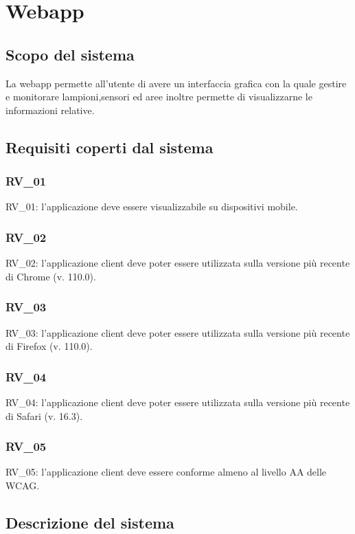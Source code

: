 \chapter{Webapp}\label{cap:webapp}

\section{Scopo del sistema}

La webapp permette all'utente di avere un interfaccia grafica con la quale gestire e monitorare lampioni,sensori ed aree inoltre permette di visualizzarne le informazioni relative.

\section{Requisiti coperti dal sistema}

\subsection{RV\_01}
RV\_01: l'applicazione deve essere visualizzabile su dispositivi mobile.

\subsection{RV\_02}
RV\_02: l'applicazione client deve poter essere utilizzata sulla versione più recente di Chrome (v. 110.0).

\subsection{RV\_03}
RV\_03: l'applicazione client deve poter essere utilizzata sulla versione più recente di Firefox (v. 110.0).

\subsection{RV\_04}
RV\_04: l'applicazione client deve poter essere utilizzata sulla versione più recente di Safari (v. 16.3).

\subsection{RV\_05}
RV\_05: l'applicazione client deve essere conforme almeno al livello AA delle WCAG.


\section{Descrizione del sistema}

